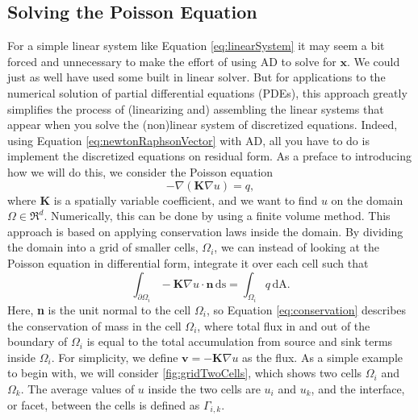 \subsection{Solving the Poisson Equation}
\label{sec:poissonEq}
For a simple linear system like Equation \eqref{eq:linearSystem} it may seem a bit forced and unnecessary to make the effort of using AD to solve for $\boldsymbol{x}$. We could just as well have used some built in linear solver. But for applications to the numerical solution of partial differential equations (PDEs), this approach greatly simplifies the process of (linearizing and) assembling the linear systems that appear when you solve the (non)linear system of discretized equations. Indeed, using Equation \eqref{eq:newtonRaphsonVector} with AD, all you have to do is implement the discretized equations on residual form.  As a preface to introducing how we will do this, we consider the Poisson equation
\begin{equation}
    -\nabla(\textbf{K}\nabla u) = q,
    \label{eq:Poisson}
\end{equation}
where \textbf{K} is a spatially variable coefficient, and we want to find $u$ on the domain $\Omega \in \Re^d$. Numerically, this can be done by using a finite volume method. This approach is based on applying conservation laws inside the domain. By dividing the domain into a grid of smaller cells, $\Omega_i$, we can instead of looking at the Poisson equation in differential form, integrate it over each cell such that
\begin{equation}
    \int_{\partial\Omega_i}\!\!- \textbf{K} \nabla u \cdot \textbf{n}\, \mbox{ds} = \int_{\Omega_i} q \,\mbox{dA}.
    \label{eq:conservation}
\end{equation}
Here, \textbf{n} is the unit normal to the cell $\Omega_i$, so Equation \eqref{eq:conservation} describes the conservation of mass in the cell $\Omega_i$, where total flux in and out of the boundary of $\Omega_i$ is equal to the total accumulation from source and sink terms inside $\Omega_i$. For simplicity, we define $\textbf{v} = - \textbf{K} \nabla u$ as the flux. As a simple example to begin with, we will consider \autoref{fig:gridTwoCells}, which shows two cells $\Omega_i$ and $\Omega_k$. The average values of $u$ inside the two cells are $u_i$ and $u_k$, and the interface, or facet, between the cells is defined as $\Gamma_{i,k}$.
